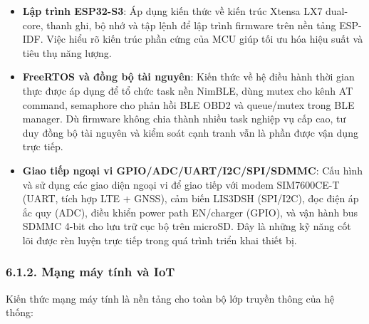 \documentclass[13pt,a4paper]{extarticle}
\renewcommand{\\}{\thesislongtableorignewline\hline}%
\providecommand{\tightlist}{%
  \setlength{\itemsep}{0pt}\setlength{\parskip}{0pt}}
\begin{document}
\begin{itemize}
\tightlist
\item
  \textbf{Lập trình ESP32-S3}: Áp dụng kiến thức về kiến trúc Xtensa LX7
  dual-core, thanh ghi, bộ nhớ và tập lệnh để lập trình firmware trên
  nền tảng ESP-IDF. Việc hiểu rõ kiến trúc phần cứng của MCU giúp tối ưu
  hóa hiệu suất và tiêu thụ năng lượng.
\item
  \textbf{FreeRTOS và đồng bộ tài nguyên}: Kiến thức về hệ điều hành
  thời gian thực được áp dụng để tổ chức task nền NimBLE, dùng mutex cho
  kênh AT command, semaphore cho phản hồi BLE OBD2 và queue/mutex trong
  BLE manager. Dù firmware không chia thành nhiều task nghiệp vụ cấp
  cao, tư duy đồng bộ tài nguyên và kiểm soát cạnh tranh vẫn là phần
  được vận dụng trực tiếp.
\item
  \textbf{Giao tiếp ngoại vi GPIO/ADC/UART/I2C/SPI/SDMMC}: Cấu hình và
  sử dụng các giao diện ngoại vi để giao tiếp với modem SIM7600CE-T
  (UART, tích hợp LTE + GNSS), cảm biến LIS3DSH (SPI/I2C), đọc điện áp
  ắc quy (ADC), điều khiển power path EN/charger (GPIO), và vận hành bus
  SDMMC 4-bit cho lưu trữ cục bộ trên microSD. Đây là những kỹ năng cốt
  lõi được rèn luyện trực tiếp trong quá trình triển khai thiết bị.
\end{itemize}

\subsubsection{6.1.2. Mạng máy tính và
IoT}\label{612-mux1ea1ng-muxe1y-tuxednh-vuxe0-iot}

Kiến thức mạng máy tính là nền tảng cho toàn bộ lớp truyền thông của hệ
thống:
\end{document}
